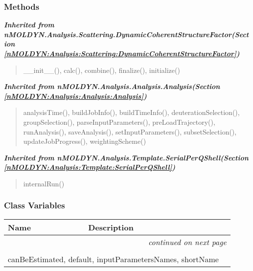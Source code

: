 
  \subsubsection{Methods}


\large{\textbf{\textit{Inherited from nMOLDYN.Analysis.Scattering.DynamicCoherentStructureFactor\textit{(Section \ref{nMOLDYN:Analysis:Scattering:DynamicCoherentStructureFactor})}}}}

\begin{quote}
\_\_init\_\_(), calc(), combine(), finalize(), initialize()
\end{quote}

\large{\textbf{\textit{Inherited from nMOLDYN.Analysis.Analysis.Analysis\textit{(Section \ref{nMOLDYN:Analysis:Analysis:Analysis})}}}}

\begin{quote}
analysisTime(), buildJobInfo(), buildTimeInfo(), deuterationSelection(), groupSelection(), parseInputParameters(), preLoadTrajectory(), runAnalysis(), saveAnalysis(), setInputParameters(), subsetSelection(), updateJobProgress(), weightingScheme()
\end{quote}

\large{\textbf{\textit{Inherited from nMOLDYN.Analysis.Template.SerialPerQShell\textit{(Section \ref{nMOLDYN:Analysis:Template:SerialPerQShell})}}}}

\begin{quote}
internalRun()
\end{quote}


  \subsubsection{Class Variables}

    \vspace{-1cm}
\hspace{\varindent}\begin{longtable}{|p{\varnamewidth}|p{\vardescrwidth}|l}
\cline{1-2}
\cline{1-2} \centering \textbf{Name} & \centering \textbf{Description}& \\
\cline{1-2}
\endhead\cline{1-2}\multicolumn{3}{r}{\small\textit{continued on next page}}\\\endfoot\cline{1-2}
\endlastfoot\multicolumn{2}{|l|}{\textit{Inherited from nMOLDYN.Analysis.Scattering.DynamicCoherentStructureFactor \textit{(Section \ref{nMOLDYN:Analysis:Scattering:DynamicCoherentStructureFactor})}}}\\
\multicolumn{2}{|p{\varwidth}|}{\raggedright canBeEstimated, default, inputParametersNames, shortName}\\
\cline{1-2}
\end{longtable}

